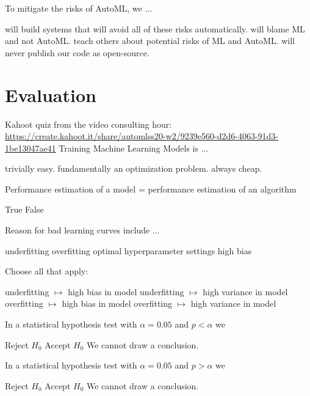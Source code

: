 \documentclass{exam}
\begin{document}
\begin{questions}
\question To mitigate the risks of AutoML, we ...
\begin{choices}
 \choice will build systems that will avoid all of these risks automatically.
 \choice will blame ML and not AutoML.
 \choice teach others about potential risks of ML and AutoML.
 \choice will never publish our code as open-source.
\end{choices}

\pagebreak
\section{Evaluation}
Kahoot quiz from the video consulting hour: \url{https://create.kahoot.it/share/automlss20-w2/9239e560-d2d6-4063-91d3-1be13047ae41}
\question Training Machine Learning Models is ...
\begin{choices}
    \choice trivially easy.
    \choice fundamentally an optimization problem. %
    \choice always cheap.
\end{choices}

\question Performance estimation of a model = performance estimation of an algorithm
\begin{choices}
    \choice True
    \choice False %
\end{choices}

\question Reason for bad learning curves include ...
\begin{choices}
    \choice underfitting %
    \choice overfitting %
    \choice optimal hyperparameter settings
    \choice high bias   %
\end{choices}

\question Choose all that apply:
\begin{choices}
    \choice underfitting $\mapsto$ high bias in model %
    \choice underfitting $\mapsto$ high variance in model
    \choice overfitting $\mapsto$ high bias in model
    \choice overfitting $\mapsto$ high variance in model %
\end{choices}

\question In a statistical hypothesis test with $\alpha = 0.05$ and $p < \alpha$ we
\begin{choices}
    \choice Reject $H_0$ %
    \choice Accept $H_0$
    \choice We cannot draw a conclusion.
\end{choices}

\question In a statistical hypothesis test with $\alpha = 0.05$ and $p > \alpha$ we
\begin{choices}
    \choice Reject $H_0$
    \choice Accept $H_0$
    \choice We cannot draw a conclusion. %
\end{choices}


\end{questions}
\end{document}
